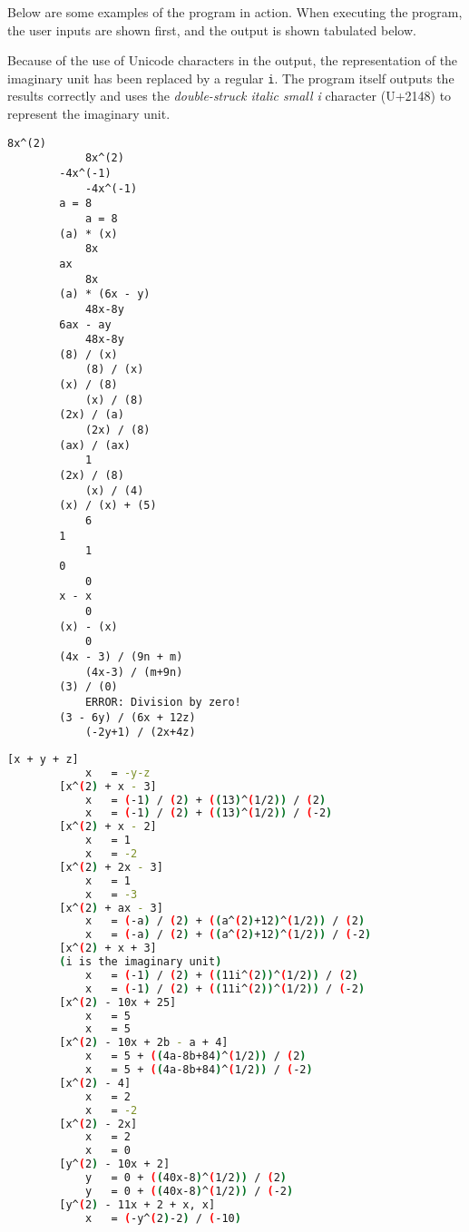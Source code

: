 Below are some examples of the program in action. When executing the program, the user inputs are shown first, and the output is shown tabulated below.

Because of the use of Unicode characters in the output, the representation of the imaginary unit has been replaced by a regular \verb|i|. The program itself outputs the results correctly and uses the \textit{double-struck italic small i} character (U+2148) to represent the imaginary unit.

\newpage

\begin{minipage}{\linewidth}
    \begin{lstlisting}[caption={Example of use of the program simplifying expressions.},label={lst:example-simplify}]
        8x^(2)
            8x^(2)
        -4x^(-1)
            -4x^(-1)
        a = 8
            a = 8
        (a) * (x)
            8x
        ax
            8x
        (a) * (6x - y)
            48x-8y
        6ax - ay
            48x-8y
        (8) / (x)
            (8) / (x)
        (x) / (8)
            (x) / (8)
        (2x) / (a)
            (2x) / (8)
        (ax) / (ax)
            1
        (2x) / (8)
            (x) / (4)
        (x) / (x) + (5)
            6
        1
            1
        0
            0
        x - x
            0
        (x) - (x)
            0
        (4x - 3) / (9n + m)
            (4x-3) / (m+9n)
        (3) / (0)
            ERROR: Division by zero!
        (3 - 6y) / (6x + 12z)
            (-2y+1) / (2x+4z)
    \end{lstlisting}
\end{minipage}

\begin{minipage}{\linewidth}
    \begin{lstlisting}[language=sh,caption={Example of use of the program evaluating expressions.}, label={lst:example-evaluate}]
        [x + y + z]
            x	= -y-z
        [x^(2) + x - 3]
            x	= (-1) / (2) + ((13)^(1/2)) / (2)
            x	= (-1) / (2) + ((13)^(1/2)) / (-2)
        [x^(2) + x - 2]
            x	= 1
            x	= -2
        [x^(2) + 2x - 3]
            x	= 1
            x	= -3
        [x^(2) + ax - 3]
            x	= (-a) / (2) + ((a^(2)+12)^(1/2)) / (2)
            x	= (-a) / (2) + ((a^(2)+12)^(1/2)) / (-2)
        [x^(2) + x + 3]
        (i is the imaginary unit)
            x	= (-1) / (2) + ((11i^(2))^(1/2)) / (2)
            x	= (-1) / (2) + ((11i^(2))^(1/2)) / (-2)
        [x^(2) - 10x + 25]
            x	= 5
            x	= 5
        [x^(2) - 10x + 2b - a + 4]
            x	= 5 + ((4a-8b+84)^(1/2)) / (2)
            x	= 5 + ((4a-8b+84)^(1/2)) / (-2)
        [x^(2) - 4]
            x	= 2
            x	= -2
        [x^(2) - 2x]
            x	= 2
            x	= 0
        [y^(2) - 10x + 2]
            y	= 0 + ((40x-8)^(1/2)) / (2)
            y	= 0 + ((40x-8)^(1/2)) / (-2)
        [y^(2) - 11x + 2 + x, x]
            x	= (-y^(2)-2) / (-10)
    \end{lstlisting}
\end{minipage}
